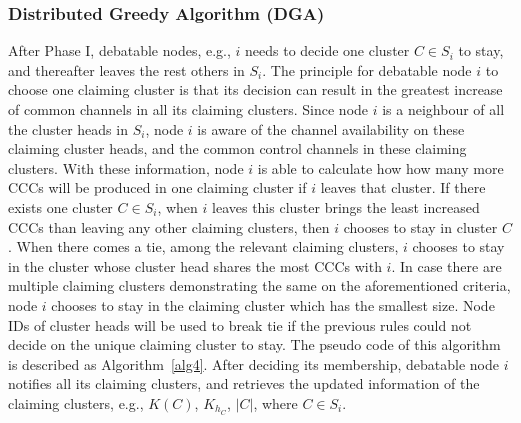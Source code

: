 \documentclass[10pt,journal,compsoc]{IEEEtran}
\theoremstyle{mytheoremstyle}
\theoremstyle{mytheoremstyle}
\theoremstyle{mytheoremstyle}
\newcommand{\eg}{e.g., }
\newcommand{\ie}{i.e., }
\begin{document}
\subsubsection{Distributed Greedy Algorithm (DGA)}
After Phase I, debatable nodes, \eg $i$ needs to decide one cluster $C\in S_i$ to stay, and thereafter leaves the rest others in $S_i$.
The principle for debatable node $i$ to choose one claiming cluster is that its decision can result in the greatest increase of common channels in all its claiming clusters.
Since node $i$ is a neighbour of all the cluster heads in $S_i$, node $i$ is aware of the channel availability on these claiming cluster heads, and the common control channels in these claiming clusters.
With these information, node $i$ is able to calculate how how many more CCCs will be produced in one claiming cluster if $i$ leaves that cluster.
If there exists one cluster $C\in S_i$, when $i$ leaves this cluster brings the least increased CCCs than leaving any other claiming clusters, then $i$ chooses to stay in cluster $C$.
When there comes a tie, among the relevant claiming clusters, $i$ chooses to stay in the cluster whose cluster head shares the most CCCs with $i$.
In case there are multiple claiming clusters demonstrating the same on the aforementioned criteria, node $i$ chooses to stay in the claiming cluster which has the smallest size.
Node IDs of cluster heads will be used to break tie if the previous rules could not decide on the unique claiming cluster to stay.
The pseudo code of this algorithm is described as Algorithm~\ref{alg4}.
After deciding its membership, debatable node $i$ notifies all its claiming clusters, and retrieves the updated information of the claiming clusters, \eg $K(C)$, $K_{h_C}$, $|C|$, where $C\in S_i$.
%
\end{document}
